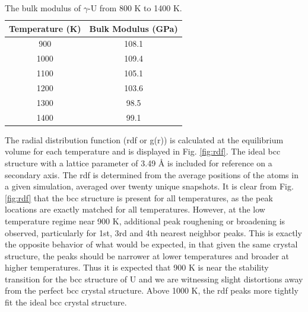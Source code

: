 \documentclass[review]{elsarticle}
\begin{document}
\begin{table}[h]
\caption{The bulk modulus of $\gamma$-U from 800 K to 1400 K.} \label{tab:bulk}
\begin{center}
\begin{tabular}{|c|c|}
	\hline
	Temperature (K) & Bulk Modulus (GPa) \\
	 \hline
	 900 & 108.1 \\
	 1000 & 109.4 \\
	 1100 & 105.1 \\
	 1200 & 103.6 \\	 
	 1300 & 98.5\\
	 1400 & 99.1 \\
	 \hline
\end{tabular}
\end{center}
\label{default}
\end{table}

\FloatBarrier

The radial distribution function (rdf or g(r)) is calculated at the equilibrium volume for each temperature and is displayed in Fig. \ref{fig:rdf}. The ideal bcc structure with a lattice parameter of 3.49 {\AA} is included for reference on a secondary axis. The rdf is determined from the average positions of the atoms in a given simulation, averaged over twenty unique snapshots. It is clear from Fig. \ref{fig:rdf} that the bcc structure is present for all temperatures, as the peak locations are exactly matched for all temperatures. However, at the low temperature regime near 900 K, additional peak roughening or broadening is observed, particularly for 1st, 3rd and 4th nearest neighbor peaks. This is exactly the opposite behavior of what would be expected, in that given the same crystal structure, the peaks should be narrower at lower temperatures and broader at higher temperatures. Thus it is expected that 900 K is near the stability transition for the bcc structure of U and we are witnessing slight distortions away from the perfect bcc crystal structure. Above 1000 K, the rdf peaks more tightly fit the ideal bcc crystal structure.
\end{document}
